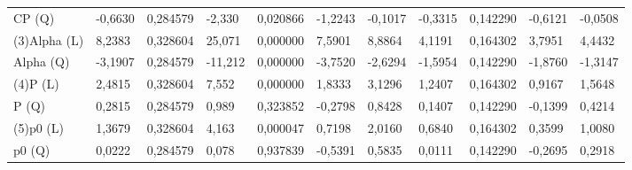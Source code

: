 \begin{table}[H]
{\begin{tabular}{lllllllllll}
CP      (Q)    & {\color[HTML]{FF0000} -0,6630}  & {\color[HTML]{FF0000} 0,284579} & {\color[HTML]{FF0000} -2,330}   & {\color[HTML]{FF0000} 0,020866} & {\color[HTML]{FF0000} -1,2243}  & {\color[HTML]{FF0000} -0,1017}  & {\color[HTML]{FF0000} -0,3315}  & {\color[HTML]{FF0000} 0,142290} & {\color[HTML]{FF0000} -0,6121}  & {\color[HTML]{FF0000} -0,0508}  \\
\rowcolor[HTML]{FFFFFF} 
(3)Alpha   (L) & {\color[HTML]{FF0000} 8,2383}   & {\color[HTML]{FF0000} 0,328604} & {\color[HTML]{FF0000} 25,071}   & {\color[HTML]{FF0000} 0,000000} & {\color[HTML]{FF0000} 7,5901}   & {\color[HTML]{FF0000} 8,8864}   & {\color[HTML]{FF0000} 4,1191}   & {\color[HTML]{FF0000} 0,164302} & {\color[HTML]{FF0000} 3,7951}   & {\color[HTML]{FF0000} 4,4432}   \\
\rowcolor[HTML]{FFFFFF} 
Alpha   (Q)    & {\color[HTML]{FF0000} -3,1907}  & {\color[HTML]{FF0000} 0,284579} & {\color[HTML]{FF0000} -11,212}  & {\color[HTML]{FF0000} 0,000000} & {\color[HTML]{FF0000} -3,7520}  & {\color[HTML]{FF0000} -2,6294}  & {\color[HTML]{FF0000} -1,5954}  & {\color[HTML]{FF0000} 0,142290} & {\color[HTML]{FF0000} -1,8760}  & {\color[HTML]{FF0000} -1,3147}  \\
\rowcolor[HTML]{FFFFFF} 
(4)P       (L) & {\color[HTML]{FF0000} 2,4815}   & {\color[HTML]{FF0000} 0,328604} & {\color[HTML]{FF0000} 7,552}    & {\color[HTML]{FF0000} 0,000000} & {\color[HTML]{FF0000} 1,8333}   & {\color[HTML]{FF0000} 3,1296}   & {\color[HTML]{FF0000} 1,2407}   & {\color[HTML]{FF0000} 0,164302} & {\color[HTML]{FF0000} 0,9167}   & {\color[HTML]{FF0000} 1,5648}   \\
\rowcolor[HTML]{FFFFFF} 
P       (Q)    & 0,2815                          & 0,284579                        & 0,989                           & 0,323852                        & -0,2798                         & 0,8428                          & 0,1407                          & 0,142290                        & -0,1399                         & 0,4214                          \\
\rowcolor[HTML]{FFFFFF} 
(5)p0      (L) & {\color[HTML]{FF0000} 1,3679}   & {\color[HTML]{FF0000} 0,328604} & {\color[HTML]{FF0000} 4,163}    & {\color[HTML]{FF0000} 0,000047} & {\color[HTML]{FF0000} 0,7198}   & {\color[HTML]{FF0000} 2,0160}   & {\color[HTML]{FF0000} 0,6840}   & {\color[HTML]{FF0000} 0,164302} & {\color[HTML]{FF0000} 0,3599}   & {\color[HTML]{FF0000} 1,0080}   \\
\rowcolor[HTML]{FFFFFF} 
p0      (Q)    & 0,0222                          & 0,284579                        & 0,078                           & 0,937839                        & -0,5391                         & 0,5835                          & 0,0111                          & 0,142290                        & -0,2695                         & 0,2918                          \\

\end{tabular}}
\end{table}
